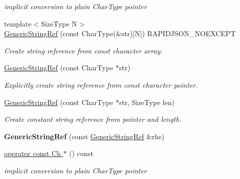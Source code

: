 \begin{DoxyCompactItemize}
\begin{DoxyCompactList}\small\item\em implicit conversion to plain Char\+Type pointer \end{DoxyCompactList}\item 
{\footnotesize template$<$Size\+Type N$>$ }\\\hyperlink{struct_generic_string_ref_aae0c070f914d2486a560150a927c22dc}{Generic\+String\+Ref} (const Char\+Type(\&str)\mbox{[}N\mbox{]}) R\+A\+P\+I\+D\+J\+S\+O\+N\+\_\+\+N\+O\+E\+X\+C\+E\+PT
\begin{DoxyCompactList}\small\item\em Create string reference from {\ttfamily const} character array. \end{DoxyCompactList}\item 
\hyperlink{struct_generic_string_ref_a9e80d81d5ad49cf0fb4128ace8c548d9}{Generic\+String\+Ref} (const Char\+Type $\ast$str)
\begin{DoxyCompactList}\small\item\em Explicitly create string reference from {\ttfamily const} character pointer. \end{DoxyCompactList}\item 
\hyperlink{struct_generic_string_ref_a8b2c6a7fdc4da1e7055f7fdcf0ac517f}{Generic\+String\+Ref} (const Char\+Type $\ast$str, Size\+Type len)
\begin{DoxyCompactList}\small\item\em Create constant string reference from pointer and length. \end{DoxyCompactList}\item 
{\bfseries Generic\+String\+Ref} (const \hyperlink{struct_generic_string_ref}{Generic\+String\+Ref} \&rhs)\hypertarget{struct_generic_string_ref_ab049693082c0b8f5066c00212e780aec}{}\label{struct_generic_string_ref_ab049693082c0b8f5066c00212e780aec}

\item 
\hyperlink{struct_generic_string_ref_a61a4241c23f65626ddc1da4ae5dac1b8}{operator const Ch $\ast$} () const \hypertarget{struct_generic_string_ref_a61a4241c23f65626ddc1da4ae5dac1b8}{}\label{struct_generic_string_ref_a61a4241c23f65626ddc1da4ae5dac1b8}

\begin{DoxyCompactList}\small\item\em implicit conversion to plain Char\+Type pointer \end{DoxyCompactList}\end{DoxyCompactItemize}
